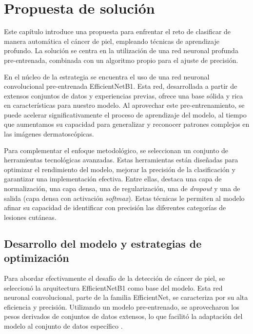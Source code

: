 \chapter{Propuesta de solución}\label{chapter:proposal}

Este capítulo introduce una propuesta para enfrentar el reto de clasificar de manera automática el cáncer de piel, empleando técnicas de aprendizaje profundo. La solución se centra en la utilización de una red neuronal profunda pre-entrenada, combinada con un algoritmo propio para el ajuste de precisión.

En el núcleo de la estrategia se encuentra el uso de una red neuronal convolucional pre-entrenada EfficientNetB1. Esta red, desarrollada a partir de extensos conjuntos de datos y experiencias previas, ofrece una base sólida y rica en características para nuestro modelo. Al aprovechar este pre-entrenamiento, se puede acelerar significativamente el proceso de aprendizaje del modelo, al tiempo que aumentamos su capacidad para generalizar y reconocer patrones complejos en las imágenes dermatoscópicas.

Para complementar el enfoque metodológico, se seleccionan un conjunto de herramientas tecnológicas avanzadas. Estas herramientas están diseñadas para optimizar el rendimiento del modelo, mejorar la precisión de la clasificación y garantizar una implementación efectiva. Entre ellas, destaca una capa de normalización, una capa densa, una de regularización, una de \textit{dropout} y una de salida (capa densa con activación \textit{softmax}). Estas técnicas le permiten al modelo afinar su capacidad de identificar con precisión las diferentes categorías de lesiones cutáneas.

\section{Desarrollo del modelo y estrategias de optimización}\label{sec:method}

Para abordar efectivamente el desafío de la detección de cáncer de piel, se seleccionó la arquitectura EfficientNetB1  como base del modelo. Esta red neuronal convolucional, parte de la familia EfficientNet, se caracteriza por su alta eficiencia y precisión. Utilizando un modelo pre-entrenado, se aprovecharon los pesos derivados de conjuntos de datos extensos, lo que facilitó la adaptación del modelo al conjunto de datos específico .


